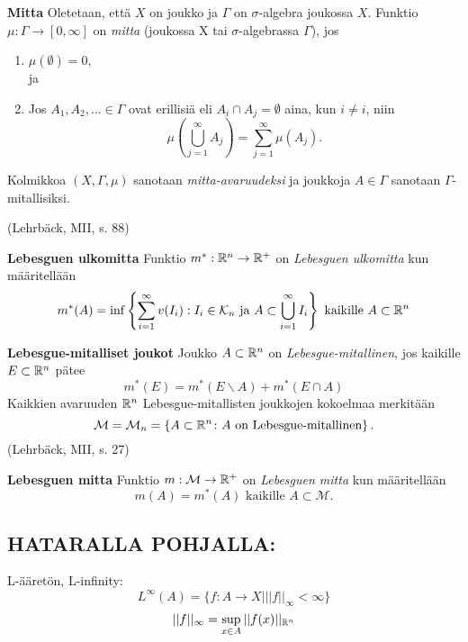 \begin{definition}
    \textbf{Mitta} Oletetaan, että $X$ on joukko ja $\Gamma$ on $\sigma$-algebra joukossa $X$. Funktio $\mu : \Gamma \to [0, \infty]$ on \textit{mitta} (joukossa X tai $\sigma$-algebrassa $\Gamma$), jos 
    \begin{enumerate}
        \item $\mu(\emptyset) = 0$, \\
        ja
        \item Jos $A_1, A_2, ... \in \Gamma$ ovat erillisiä eli $A_i \cap A_j = \emptyset$ aina, kun $i \ne i$, niin
        $$\mu\left(\bigcup_{j=1}^\infty A_j \right) = \sum_{j=1}^\infty \mu(A_j).$$
    \end{enumerate}
    
    Kolmikkoa $(X,\Gamma, \mu)$ sanotaan \textit{mitta-avaruudeksi} ja joukkoja $A\in \Gamma$ sanotaan $\Gamma$-mitallisiksi.
    
    (Lehrbäck, MII, s. 88)
\end{definition}

\begin{definition}
    \textbf{Lebesguen ulkomitta} Funktio $m^* : \mathbb{R}^n \to \mathbb{R}^+$ on \textit{Lebesguen ulkomitta} kun määritellään
    $$m^*(A) = \inf\left\{\sum_{i=1}^\infty v(I_i) : I_i \in \mathcal K_n \text{ ja } A \subset \bigcup_{i=1}^{\infty}I_i\right\} \text{ kaikille } A \subset \mathbb{R}^n$$
\end{definition}

\begin{definition}
    \textbf{Lebesgue-mitalliset joukot} Joukko $A\subset \mathbb{R}^n$ on \textit{Lebesgue-mitallinen}, jos kaikille $E\subset \mathbb{R}^n$ pätee
    $$m^*(E) = m^*(E \backslash A) + m^*(E\cap A)$$
    Kaikkien avaruuden $\mathbb{R}^n$ Lebesgue-mitallisten joukkojen kokoelmaa merkitään 
    $$\mathcal M = \mathcal M_n = \left\{A\subset \mathbb{R}^n \colon A \text{ on Lebesgue-mitallinen} \right\}.$$
    (Lehrbäck, MII, s. 27)
\end{definition}

\begin{definition}
    \textbf{Lebesguen mitta} Funktio $m : \mathcal M \to \mathbb{R}^+$ on \textit{Lebesguen mitta} kun määritellään
    $$m(A) = m^*(A) \text{ kaikille } A\subset \mathcal M.$$
\end{definition}

\subsection{HATARALLA POHJALLA:}
\begin{definition}
L-ääretön, L-infinity:
    \[L^\infty (A) = \{f:A\to X | ||f||_\infty < \infty\}\] 
    \[||f||_\infty = \sup_{x\in A} ||f(x)||_{\mathbb{R}^n}\]
\end{definition}



